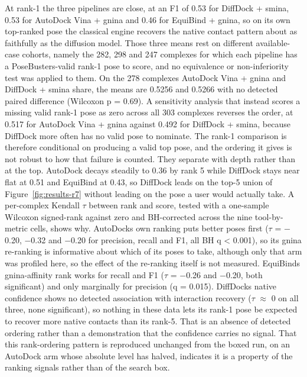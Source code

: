 At rank-1 the three pipelines are close, at an F1 of 0.53 for DiffDock + smina, 0.53 for AutoDock Vina + gnina and 0.46 for EquiBind + gnina, so on its own top-ranked pose the classical engine recovers the native contact pattern about as faithfully as the diffusion model. Those three means rest on different available-case cohorts, namely the 282, 298 and 247 complexes for which each pipeline has a PoseBusters-valid rank-1 pose to score, and no equivalence or non-inferiority test was applied to them. On the 278 complexes AutoDock Vina + gnina and DiffDock + smina share, the means are 0.5256 and 0.5266 with no detected paired difference (Wilcoxon p = 0.69). A sensitivity analysis that instead scores a missing valid rank-1 pose as zero across all 303 complexes reverses the order, at 0.517 for AutoDock Vina + gnina against 0.492 for DiffDock + smina, because DiffDock more often has no valid pose to nominate. The rank-1 comparison is therefore conditional on producing a valid top pose, and the ordering it gives is not robust to how that failure is counted. They separate with depth rather than at the top. AutoDock decays steadily to 0.36 by rank 5 while DiffDock stays near flat at 0.51 and EquiBind at 0.43, so DiffDock leads on the top-5 union of Figure~\ref{fig:results-r7} without leading on the pose a user would actually take. A per-complex Kendall \ensuremath{\tau} between rank and score, tested with a one-sample Wilcoxon signed-rank against zero and BH-corrected across the nine tool-by-metric cells, shows why. AutoDock\textquotesingle s own ranking puts better poses first (\ensuremath{\tau} = \ensuremath{-}0.20, \ensuremath{-}0.32 and \ensuremath{-}0.20 for precision, recall and F1, all BH q \textless{} 0.001), so its gnina re-ranking is informative about which of its poses to take, although only that arm was profiled here, so the effect of the re-ranking itself is not measured. EquiBind\textquotesingle s gnina-affinity rank works for recall and F1 (\ensuremath{\tau} = \ensuremath{-}0.26 and \ensuremath{-}0.20, both significant) and only marginally for precision (q = 0.015). DiffDock\textquotesingle s native confidence shows no detected association with interaction recovery (\ensuremath{\tau} \ensuremath{\approx} 0 on all three, none significant), so nothing in these data lets its rank-1 pose be expected to recover more native contacts than its rank-5. That is an absence of detected ordering rather than a demonstration that the confidence carries no signal. That this rank-ordering pattern is reproduced unchanged from the boxed run, on an AutoDock arm whose absolute level has halved, indicates it is a property of the ranking signals rather than of the search box.

